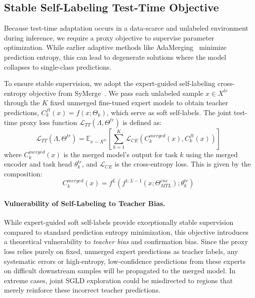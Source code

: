 \subsection{Stable Self-Labeling Test-Time Objective}
Because test-time adaptation occurs in a data-scarce and unlabeled environment during inference, we require a proxy objective to supervise parameter optimization.
While earlier adaptive methods like AdaMerging~\cite{yang2024adamerging} minimize prediction entropy, this can lead to degenerate solutions where the model collapses to single-class predictions.

To ensure stable supervision, we adopt the expert-guided self-labeling cross-entropy objective from SyMerge~\cite{jung2025symerge}.
We pass each unlabeled sample $x \in X^{te}$ through the $K$ fixed unmerged fine-tuned expert models to obtain teacher predictions, $C_k^{ft}(x) = f(x; \Theta_k)$, which serve as soft self-labels.
The joint test-time proxy loss function $\mathcal{L}_{TT}(\Lambda, \Theta^{tr})$ is defined as:
\begin{equation}
\mathcal{L}_{TT}(\Lambda, \Theta^{tr}) = \mathbb{E}_{x \sim X^{te}}\left[ \sum_{k=1}^K \mathcal{L}_{CE}\left( C_k^{merged}(x), C_k^{ft}(x) \right) \right]
\end{equation}
where $C_k^{merged}(x)$ is the merged model's output for task $k$ using the merged encoder and task head $\theta^{tr}_k$, and $\mathcal{L}_{CE}$ is the cross-entropy loss.
This is given by the composition:
\begin{equation}
    C_k^{merged}(x) = f^L\left(f^{1:L-1}(x; \Theta_{MTL}^{enc}); \theta^{tr}_k\right)
\end{equation}

\paragraph{Vulnerability of Self-Labeling to Teacher Bias.} While expert-guided soft self-labels provide exceptionally stable supervision compared to standard prediction entropy minimization, this objective introduces a theoretical vulnerability to \emph{teacher bias} and confirmation bias.
Since the proxy loss relies purely on fixed, unmerged expert predictions as teacher labels, any systematic errors or high-entropy, low-confidence predictions from these experts on difficult downstream samples will be propagated to the merged model.
In extreme cases, joint SGLD exploration could be misdirected to regions that merely reinforce these incorrect teacher predictions.

